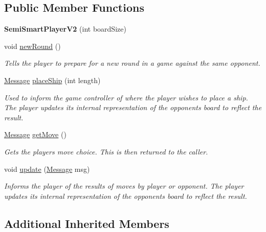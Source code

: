 \subsection*{Public Member Functions}
\begin{DoxyCompactItemize}
\item 
{\bfseries Semi\+Smart\+Player\+V2} (int board\+Size)\hypertarget{classSemiSmartPlayerV2_a5d3a68fcf855737613f2e30dd53aad0c}{}\label{classSemiSmartPlayerV2_a5d3a68fcf855737613f2e30dd53aad0c}

\item 
void \hyperlink{classSemiSmartPlayerV2_ad1e49a603829e62252c9e4885c6e57f9}{new\+Round} ()
\begin{DoxyCompactList}\small\item\em Tells the player to prepare for a new round in a game against the same opponent. \end{DoxyCompactList}\item 
\hyperlink{classMessage}{Message} \hyperlink{classSemiSmartPlayerV2_a42769c809458a33f67751ba9dd566e23}{place\+Ship} (int length)
\begin{DoxyCompactList}\small\item\em Used to inform the game controller of where the player wishes to place a ship. The player updates its internal representation of the opponent\textquotesingle{}s board to reflect the result. \end{DoxyCompactList}\item 
\hyperlink{classMessage}{Message} \hyperlink{classSemiSmartPlayerV2_a60e4c3dd7caee6d43df20805b714ed83}{get\+Move} ()
\begin{DoxyCompactList}\small\item\em Gets the player\textquotesingle{}s move choice. This is then returned to the caller. \end{DoxyCompactList}\item 
void \hyperlink{classSemiSmartPlayerV2_a000b503d95d671bb819645b61e7fbc84}{update} (\hyperlink{classMessage}{Message} msg)
\begin{DoxyCompactList}\small\item\em Informs the player of the results of move\textquotesingle{}s by player or opponent. The player updates its internal representation of the opponent\textquotesingle{}s board to reflect the result. \end{DoxyCompactList}\end{DoxyCompactItemize}
\subsection*{Additional Inherited Members}


